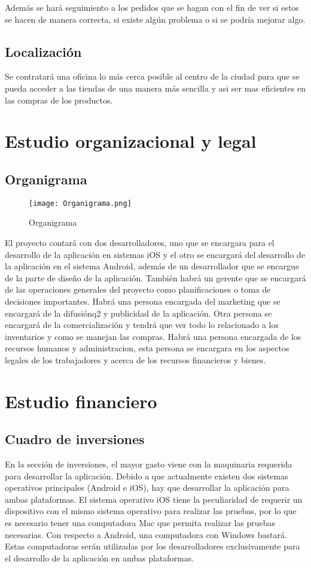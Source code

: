 \documentclass[11pt]{article}
\begin{document}
   Además se har\'a seguimiento a los pedidos que se hagan con el fin de ver si estos se hacen de manera correcta, si existe algún problema o si se podr\'ia mejorar algo.
   
   \subsection{Localizaci\'on}
   Se contratar\'a una oficina lo m\'as cerca posible al centro de la ciudad para que se pueda acceder a las tiendas de una manera m\'as sencilla y asi ser mas eficientes en las compras de los productos.
   
\section{Estudio organizacional y legal}
   \subsection{Organigrama}
        \begin{figure}[H]
            \centering
            \texttt{[image: Organigrama.png]}
            \caption{Organigrama}
            \label{organigrama}
        \end{figure}
    El proyecto contar\'a con dos desarrolladores, uno que se encargara para el desarrollo de la aplicaci\'on en sistemas iOS y el otro se encargar\'a del desarrollo de la aplicaci\'on en el sistema Android, además de un desarrollador que se encargue de la parte de diseño de la aplicaci\'on. Tambi\'en habr\'a un gerente que se encargar\'a de las operaciones generales del proyecto como planificaciones o toma de decisiones importantes. Habr\'a una persona encargada del marketing que se encargar\'a de la difusiónq2 y publicidad de la aplicaci\'on. Otra persona se encargar\'a de la comercializaci\'on y tendr\'a que ver todo lo relacionado a los inventarios y como se manejan las compras. Habr\'a una persona encargada de los recursos humanos y administracion, esta persona se encargara en los aspectos legales de los trabajadores y acerca de los recursos financieros y bienes.


\section{Estudio financiero}
    \subsection{Cuadro de inversiones}
    En la sección de inversiones, el mayor gasto viene con la maquinaria requerida para desarrollar la aplicación. Debido a que actualmente existen dos sistemas operativos principales (Android e iOS), hay que desarrollar la aplicación para ambas plataformas. El sistema operativo iOS tiene la peculiaridad de requerir un dispositivo con el mismo sistema operativo para realizar las pruebas, por lo que es necesario tener una computadora Mac que permita realizar las pruebas necesarias. Con respecto a Android, una computadora con Windows bastará. Estas computadoras serán utilizadas por los desarrolladores exclusivamente para el desarrollo de la aplicación en ambas plataformas.\\
    
\end{document}
